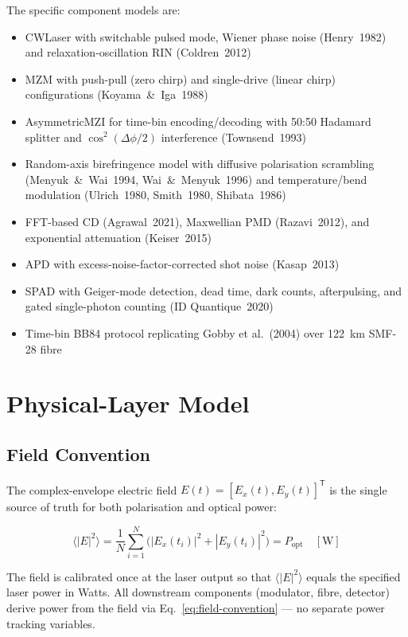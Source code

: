 \documentclass[3p,times,preprint]{elsarticle}
\begin{document}
The specific component models are:
\begin{itemize}[nosep]
  \item CWLaser with switchable pulsed mode, Wiener phase noise (Henry~1982)
    and relaxation-oscillation RIN (Coldren~2012)
  \item MZM with push-pull (zero chirp) and single-drive (linear chirp)
    configurations (Koyama~\&~Iga~1988)
  \item AsymmetricMZI for time-bin encoding/decoding with 50:50 Hadamard
    splitter and $\cos^2(\Delta\phi/2)$ interference (Townsend~1993)
  \item Random-axis birefringence model with diffusive polarisation
    scrambling (Menyuk~\&~Wai~1994, Wai~\&~Menyuk~1996) and
    temperature/bend modulation (Ulrich~1980, Smith~1980, Shibata~1986)
  \item FFT-based CD (Agrawal~2021), Maxwellian PMD (Razavi~2012), and
    exponential attenuation (Keiser~2015)
  \item APD with excess-noise-factor-corrected shot noise (Kasap~2013)
  \item SPAD with Geiger-mode detection, dead time, dark counts,
    afterpulsing, and gated single-photon counting (ID Quantique~2020)
  \item Time-bin BB84 protocol replicating Gobby et al.~(2004) over
    122~km SMF-28 fibre
\end{itemize}

\section{Physical-Layer Model}

\subsection{Field Convention}

The complex-envelope electric field $E(t) = [E_x(t), E_y(t)]^\mathsf{T}$ is
the single source of truth for both polarisation and optical power:

\begin{equation}
  \langle |E|^2 \rangle = \frac{1}{N}\sum_{i=1}^N
  \bigl(|E_x(t_i)|^2 + |E_y(t_i)|^2\bigr) = P_{\text{opt}} \quad [\text{W}]
  \label{eq:field-convention}
\end{equation}

The field is calibrated once at the laser output so that $\langle|E|^2\rangle$
equals the specified laser power in Watts.  All downstream components
(modulator, fibre, detector) derive power from the field via
Eq.~\ref{eq:field-convention} --- no separate power tracking variables.
\end{document}
